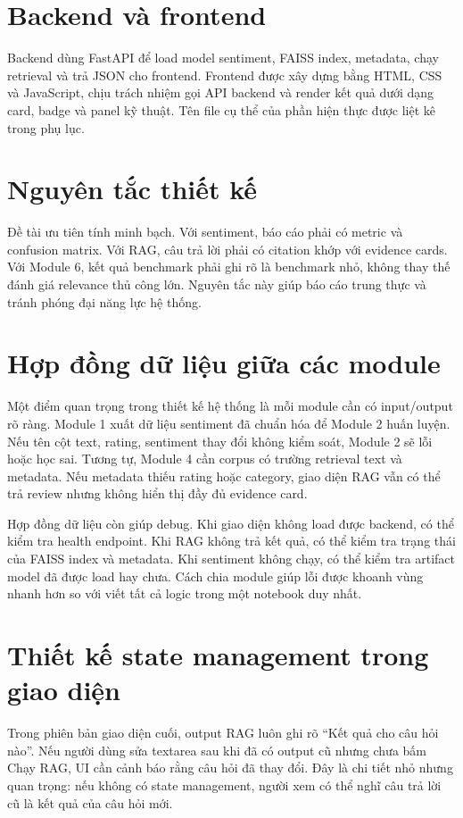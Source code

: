 \section{Backend và frontend}
Backend dùng FastAPI để load model sentiment, FAISS index, metadata, chạy retrieval và trả JSON cho frontend. Frontend được xây dựng bằng HTML, CSS và JavaScript, chịu trách nhiệm gọi API backend và render kết quả dưới dạng card, badge và panel kỹ thuật. Tên file cụ thể của phần hiện thực được liệt kê trong phụ lục.

\section{Nguyên tắc thiết kế}
Đề tài ưu tiên tính minh bạch. Với sentiment, báo cáo phải có metric và confusion matrix. Với RAG, câu trả lời phải có citation khớp với evidence cards. Với Module 6, kết quả benchmark phải ghi rõ là benchmark nhỏ, không thay thế đánh giá relevance thủ công lớn. Nguyên tắc này giúp báo cáo trung thực và tránh phóng đại năng lực hệ thống.

\section{Hợp đồng dữ liệu giữa các module}
Một điểm quan trọng trong thiết kế hệ thống là mỗi module cần có input/output rõ ràng. Module 1 xuất dữ liệu sentiment đã chuẩn hóa để Module 2 huấn luyện. Nếu tên cột text, rating, sentiment thay đổi không kiểm soát, Module 2 sẽ lỗi hoặc học sai. Tương tự, Module 4 cần corpus có trường retrieval text và metadata. Nếu metadata thiếu rating hoặc category, giao diện RAG vẫn có thể trả review nhưng không hiển thị đầy đủ evidence card.

Hợp đồng dữ liệu còn giúp debug. Khi giao diện không load được backend, có thể kiểm tra health endpoint. Khi RAG không trả kết quả, có thể kiểm tra trạng thái của FAISS index và metadata. Khi sentiment không chạy, có thể kiểm tra artifact model đã được load hay chưa. Cách chia module giúp lỗi được khoanh vùng nhanh hơn so với viết tất cả logic trong một notebook duy nhất.

\section{Thiết kế state management trong giao diện}
Trong phiên bản giao diện cuối, output RAG luôn ghi rõ “Kết quả cho câu hỏi nào”. Nếu người dùng sửa textarea sau khi đã có output cũ nhưng chưa bấm Chạy RAG, UI cần cảnh báo rằng câu hỏi đã thay đổi. Đây là chi tiết nhỏ nhưng quan trọng: nếu không có state management, người xem có thể nghĩ câu trả lời cũ là kết quả của câu hỏi mới.

